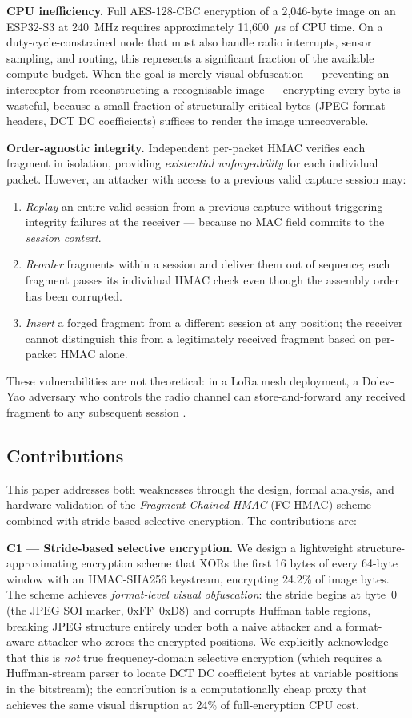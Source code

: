 \documentclass[journal]{IEEEtran}
\begin{document}
\textbf{CPU inefficiency.}  Full AES-128-CBC encryption of a 2{,}046-byte image
on an ESP32-S3 at 240~MHz requires approximately 11{,}600~$\mu$s of CPU time.
On a duty-cycle-constrained node that must also handle radio interrupts, sensor
sampling, and routing, this represents a significant fraction of the available
compute budget.  When the goal is merely visual obfuscation --- preventing an
interceptor from reconstructing a recognisable image --- encrypting every byte
is wasteful, because a small fraction of structurally critical bytes (JPEG
format headers, DCT DC coefficients) suffices to render the image
unrecoverable.

\textbf{Order-agnostic integrity.}  Independent per-packet HMAC verifies each
fragment in isolation, providing \emph{existential unforgeability} for each
individual packet.  However, an attacker with access to a previous valid
capture session may:
\begin{enumerate}
  \item \emph{Replay} an entire valid session from a previous capture without
    triggering integrity failures at the receiver --- because no MAC field
    commits to the \emph{session context}.
  \item \emph{Reorder} fragments within a session and deliver them out of
    sequence; each fragment passes its individual HMAC check even though the
    assembly order has been corrupted.
  \item \emph{Insert} a forged fragment from a different session at any
    position; the receiver cannot distinguish this from a legitimately received
    fragment based on per-packet HMAC alone.
\end{enumerate}
These vulnerabilities are not theoretical: in a LoRa mesh deployment, a
Dolev-Yao adversary who controls the radio channel can store-and-forward any
received fragment to any subsequent session \cite{tamarin_prover}.

\subsection*{Contributions}

This paper addresses both weaknesses through the design, formal analysis, and
hardware validation of the \emph{Fragment-Chained HMAC} (FC-HMAC) scheme
combined with stride-based selective encryption.  The contributions are:

\textbf{C1 --- Stride-based selective encryption.}
We design a lightweight structure-approximating encryption scheme that XORs the
first 16 bytes of every 64-byte window with an HMAC-SHA256 keystream, encrypting
24.2\% of image bytes.  The scheme achieves \emph{format-level visual
obfuscation}: the stride begins at byte~0 (the JPEG SOI marker, 0xFF~0xD8) and
corrupts Huffman table regions, breaking JPEG structure entirely under both a
naive attacker and a format-aware attacker who zeroes the encrypted positions.
We explicitly acknowledge that this is \emph{not} true frequency-domain
selective encryption (which requires a Huffman-stream parser to locate DCT DC
coefficient bytes at variable positions in the bitstream); the contribution is a
computationally cheap proxy that achieves the same visual disruption at 24\% of
full-encryption CPU cost.
\end{document}
